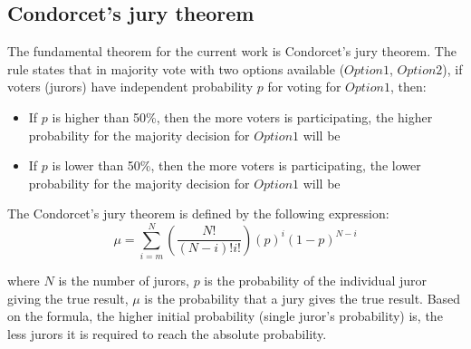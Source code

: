 \documentclass[12pt]{article}
\theoremstyle{definition}
\begin{document}
\subsection{Condorcet's jury theorem}
The fundamental theorem for the current work is Condorcet's jury theorem. The rule states that in majority vote with two options available ($Option1$, $Option2$), if voters (jurors) have independent probability $p$ for voting for $Option1$, then:
\begin{itemize}
\item If $p$ is higher than 50\%, then the more voters is participating, the higher probability for the majority decision for $Option1$ will be
\item If $p$ is lower than 50\%, then the more voters is participating, the lower probability for the majority decision for $Option1$ will be
\end{itemize}
The Condorcet's jury theorem is defined by the following expression:
\begin{equation} \label{eq:1}
\mu = \sum_{i=m}^{N} (\frac{N!}{(N-i)!i!})(p)^i(1-p)^{N-i}
\end{equation}

where $N$ is the number of jurors, $p$ is the probability of the individual juror giving the true result, $\mu$ is the probability that a jury gives the true result.
Based on the formula, the higher initial probability (single juror's probability) is, the less jurors it is required to reach the absolute probability.
\end{document}
